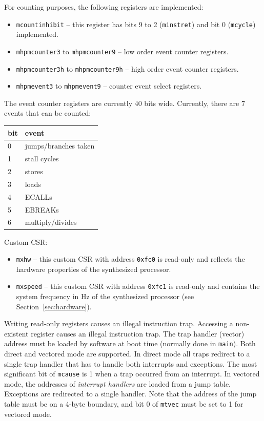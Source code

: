 \documentclass[12pt]{article}
\begin{document}
For counting purposes, the following registers are implemented:

\begin{itemize}
\item \lstinline|mcountinhibit| -- this register has bits 9 to 2 (\lstinline|minstret|) and bit 0 (\lstinline|mcycle|) implemented.
\item \lstinline|mhpmcounter3| to \lstinline|mhpmcounter9| -- low order event counter registers.
\item \lstinline|mhpmcounter3h| to \lstinline|mhpmcounter9h| -- high order event counter registers.
\item \lstinline|mhpmevent3| to \lstinline|mhpmevent9| -- counter event select registers.
\end{itemize}

The event counter registers are currently 40 bits wide. Currently, there are 7 events that can be counted:

\begin{table}[!ht]
\centering
\begin{tabular}{ll}
\toprule
bit & event \\ \midrule
0 & jumps/branches taken\\
1 & stall cycles \\
2 & stores \\
3 & loads \\
4 & ECALLs \\
5 & EBREAKs\\
6 & multiply/divides\\
\bottomrule
\end{tabular}
\end{table}

Custom CSR:

\begin{itemize}
\item \lstinline|mxhw| -- this custom CSR with address \lstinline|0xfc0| is read-only and reflects the hardware properties of the synthesized processor.
\item \lstinline|mxspeed| -- this custom CSR with address \lstinline|0xfc1| is read-only and contains the system frequency in Hz of the synthesized processor (see Section~\ref{sec:hardware}).
\end{itemize}

Writing read-only registers causes an illegal instruction trap. Accessing a non-existent register causes an illegal instruction trap. The trap handler (vector) address must be loaded by software at boot time (normally done in \lstinline|main|). Both direct and vectored mode are supported. In direct mode all traps redirect to a single trap handler that has to handle both interrupts and exceptions. The most significant bit of \lstinline|mcause| is 1 when a trap occurred from an interrupt. In vectored mode, the addresses of \emph{interrupt handlers} are loaded from a jump table. Exceptions are redirected to a single handler. Note that the address of the jump table must be on a 4-byte boundary, and bit 0 of \lstinline|mtvec| must be set to 1 for vectored mode.
\end{document}
